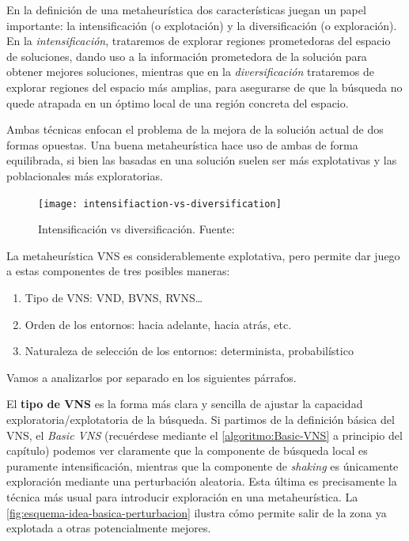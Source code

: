 En la definición de una metaheurística dos características juegan un papel importante: la intensificación (o explotación) y la diversificación (o exploración). En la \textit{intensificación}, trataremos de explorar regiones prometedoras del espacio de soluciones, dando uso a la información prometedora de la solución para obtener mejores soluciones, mientras que en la \textit{diversificación} trataremos de explorar regiones del espacio más amplias, para asegurarse de que la búsqueda no quede atrapada en un óptimo local de una región concreta del espacio.

Ambas técnicas enfocan el problema de la mejora de la solución actual de dos formas opuestas. Una buena metaheurística
hace uso de ambas de forma equilibrada, si bien las basadas en una solución suelen ser más explotativas y las poblacionales más exploratorias.

\begin{figure}
    \centering    \texttt{[image: intensifiaction-vs-diversification]}
    \caption[Intensificación vs diversificación]{Intensificación vs diversificación. Fuente:~\cite{sota:metaheuristicas-design-impl}}
    \label{fig:intensifiaction-vs-diversification}
\end{figure}

La metaheurística VNS es considerablemente explotativa, pero permite dar juego a estas componentes de tres posibles maneras:
\begin{enumerate}[label=\alph*.]
    \item Tipo de VNS: VND, BVNS, RVNS\ldots
    \item Orden de los entornos: hacia adelante, hacia atrás, etc.
    \item Naturaleza de selección de los entornos: determinista, probabilístico
\end{enumerate}

Vamos a analizarlos por separado en los siguientes párrafos.

El \textbf{tipo de VNS} es la forma más clara y sencilla de ajustar la capacidad exploratoria/explotatoria de la búsqueda. Si partimos de la definición básica del VNS, el \textit{Basic VNS} (recuérdese mediante el \autoref{algoritmo:Basic-VNS} a principio del capítulo) podemos ver claramente que la componente de búsqueda local es puramente intensificación, mientras que la componente de \textit{shaking} es únicamente exploración mediante una perturbación aleatoria. Esta última es precisamente la técnica más usual para introducir exploración en una metaheurística. La \autoref{fig:esquema-idea-basica-perturbacion} ilustra cómo permite salir de la zona ya explotada a otras potencialmente mejores.

